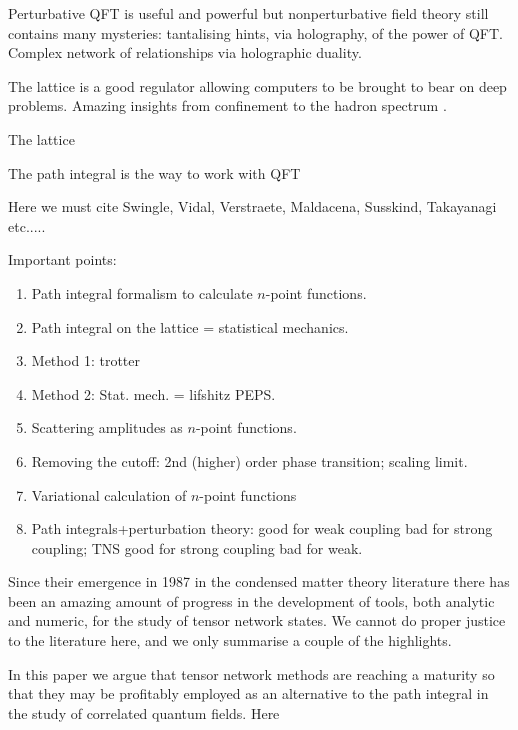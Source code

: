 \documentclass[twocolumn,lengthcheck,superscriptaddress]{revtex4-1}
\theoremstyle{definition}
\theoremstyle{remark}
\begin{document}
Perturbative QFT is useful and powerful but nonperturbative field theory still contains many mysteries: tantalising hints, via holography, of the power of QFT. Complex network of relationships via holographic duality.

The lattice is a good regulator allowing computers to be brought to bear on deep problems. Amazing insights
\cite{wilson:1974b} from confinement to the hadron spectrum \cite{duerr:2008a}.

The lattice 



The path integral is the way to work with QFT


\cite{horava:2008a}\cite{ardonne:2004a}\cite{horava:2009a}\cite{swingle:2012a}\cite{aharonov:2003a}\cite{rudolph:2002a}\cite{ryu:2006a}\cite{ryu:2006b}\cite{nishioka:2009a}\cite{maldacena:2013a}\cite{hartman:2013a}


Here we must cite Swingle, Vidal, Verstraete, Maldacena, Susskind, Takayanagi etc.....

Important points:
\begin{enumerate}
	\item Path integral formalism to calculate $n$-point functions.
	\item Path integral on the lattice = statistical mechanics.
	\item Method 1: trotter
	\item Method 2: Stat. mech. = lifshitz PEPS.
	\item Scattering amplitudes as $n$-point functions.
	\item Removing the cutoff: 2nd (higher) order phase transition; scaling limit.
	\item Variational calculation of $n$-point functions 
	\item Path integrals+perturbation theory: good for weak coupling bad for strong coupling; TNS good for strong coupling bad for weak.
\end{enumerate}


Since their emergence in 1987 in the condensed matter theory literature there has been an amazing amount of progress in the development of tools, both analytic and numeric, for the study of tensor network states. We cannot do proper justice to the literature here, and we only summarise a couple of the highlights. 

In this paper we argue that tensor network methods are reaching a maturity so that they may be profitably employed as an alternative to the path integral in the study of correlated quantum fields. Here  
\end{document}
